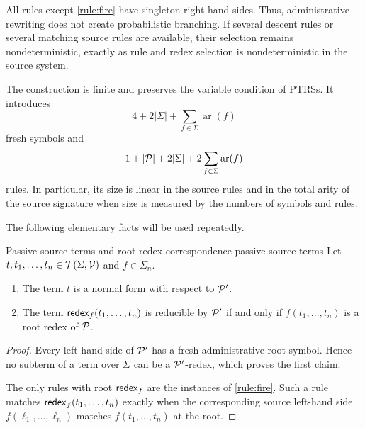 All rules except \eqref{rule:fire} have singleton right-hand sides.  Thus,
administrative rewriting does not create probabilistic branching.  If several
descent rules or several matching source rules are available, their selection
remains nondeterministic, exactly as rule and redex selection is
nondeterministic in the source system.

The construction is finite and preserves the variable condition of PTRSs.  It
introduces
\[
  4+2|\Sigma|+\sum_{f\in\Sigma}\operatorname{ar}(f)
\]
fresh symbols and
\[
  1+|\P|+2|\Sigma|
    +2\sum_{f\in\Sigma}\operatorname{ar}(f)
\]
rules.  In particular, its size is linear in the source rules and in the total
arity of the source signature when size is measured by the numbers of symbols
and rules.

The following elementary facts will be used repeatedly.

\begin{Lemma}{Passive source terms and root-redex correspondence}
  {passive-source-terms}
  Let \(t,t_1,\ldots,t_n\in\TSet{\Sigma}{\Var}\) and
  \(f\in\Sigma_n\).
  \begin{enumerate}
    \item The term \(t\) is a normal form with respect to \(\P'\).
    \item The term \(\tredex_f(t_1,\ldots,t_n)\) is reducible by \(\P'\) if
          and only if \(f(t_1,\ldots,t_n)\) is a root redex of \(\P\).
  \end{enumerate}
\end{Lemma}

\begin{proof}
  Every left-hand side of \(\P'\) has a fresh administrative root symbol.
  Hence no subterm of a term over \(\Sigma\) can be a \(\P'\)-redex, which
  proves the first claim.

  The only rules with root \(\tredex_f\) are the instances of
  \eqref{rule:fire}.  Such a rule matches
  \(\tredex_f(t_1,\ldots,t_n)\) exactly when the corresponding source
  left-hand side \(f(\ell_1,\ldots,\ell_n)\) matches
  \(f(t_1,\ldots,t_n)\) at the root.
\end{proof}

